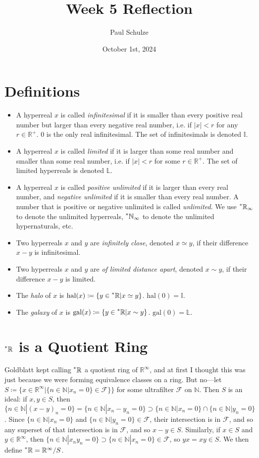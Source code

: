 \documentclass{article}
\title{Week 5 Reflection}
\author{Paul Schulze}
\date{October 1st, 2024}
\newcommand{\hal}[1]{\mathrm{hal}(#1)}
\newcommand{\gal}[1]{\mathrm{gal}(#1)}
\newcommand{\reals}{\mathbb{R}}
\newcommand{\hreals}{\prescript{*}{}{\mathbb{R}}}
\newcommand{\nats}{\mathbb{N}}
\newcommand{\hnats}{\prescript{*}{}{\mathbb{N}}}
\begin{document}
\maketitle

\section*{Definitions}
\begin{itemize}
    \item A hyperreal $x$ is called \textit{infinitesimal} if it is smaller than every positive real number but larger than every negative real number, i.e. if $|x| < r$ for any $r \in \reals^+$. $0$ is the only real infinitesimal. The set of infinitesimals is denoted $\mathbb{I}$.
    \item A hyperreal $x$ is called \textit{limited} if it is larger than some real number and smaller than some real number, i.e. if $|x| < r$ for some $r \in \reals^+$. The set of limited hyperreals is denoted $\mathbb{L}$.
    \item A hyperreal $x$ is called \textit{positive unlimited} if it is larger than every real number, and \textit{negative unlimited} if it is smaller than every real number. A number that is positive or negative unlimited is called \textit{unlimited}. We use $\hreals_\infty$ to denote the unlimited hyperreals, $\hnats_\infty$ to denote the unlimited hypernaturals, etc.
    \item Two hyperreals $x$ and $y$ are \textit{infinitely close}, denoted $x \simeq y$, if their difference $x - y$ is infinitesimal.
    \item Two hyperreals $x$ and $y$ are \textit{of limited distance apart}, denoted $x \sim y$, if their difference $x - y$ is limited.
    \item The \textit{halo} of $x$ is $\hal{x} \coloneq \{y \in \hreals | x \simeq y\}$. $\hal{0} = \mathbb{I}$.
    \item The \textit{galaxy} of $x$ is $\gal{x} \coloneq \{y \in \hreals | x \sim y\}$. $\gal{0} = \mathbb{L}$.
\end{itemize}

\section*{$\hreals$ is a Quotient Ring}

Goldblatt kept calling $\hreals$ a quotient ring of $\reals^\infty$, and at first I thought this was just because we were forming equivalence classes on a ring. But no---let $S \coloneq \{x \in \reals^\infty | \{n \in \nats | x_n = 0\} \in \mathcal{F}\}\}$ for some ultrafilter $\mathcal{F}$ on $\nats$. Then $S$ is an ideal: if $x, y \in S$, then $\{n \in \nats | (x-y)_n = 0\} = \{n \in \nats | x_n - y_n = 0\} \supset \{n \in \nats | x_n = 0\} \cap \{n \in \nats | y_n = 0\}$. Since $\{n \in \nats | x_n = 0\}$ and $\{n \in \nats | y_n = 0\} \in \mathcal{F}$, their intersection is in $\mathcal{F}$, and so any superset of that intersection is in $\mathcal{F}$, and so $x - y \in S$. Similarly, if $x \in S$ and $y \in \reals^\infty$, then $\{n \in \nats | x_n y_n = 0\} \supset \{n \in \nats | x_n = 0\} \in \mathcal{F}$, so $yx = xy \in S$. We then define $\hreals = \reals^\infty / S$.
\end{document}

